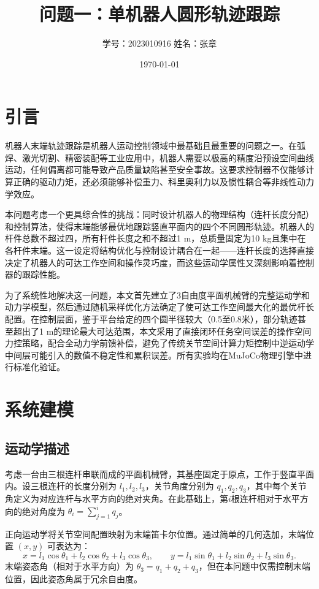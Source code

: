 \documentclass{article}
\title{\textbf{问题一：单机器人圆形轨迹跟踪}}
\author{学号：2023010916 \quad 姓名：张章}
\date{\today}
\begin{document}
\maketitle

\section{引言}

机器人末端轨迹跟踪是机器人运动控制领域中最基础且最重要的问题之一。在弧焊、激光切割、精密装配等工业应用中，机器人需要以极高的精度沿预设空间曲线运动，任何偏离都可能导致产品质量缺陷甚至安全事故。这要求控制器不仅能够计算正确的驱动力矩，还必须能够补偿重力、科里奥利力以及惯性耦合等非线性动力学效应。

本问题考虑一个更具综合性的挑战：同时设计机器人的物理结构（连杆长度分配）和控制算法，使得末端能够最优地跟踪竖直平面内的四个不同圆形轨迹。机器人的杆件总数不超过四，所有杆件长度之和不超过1 m，总质量固定为10 kg且集中在各杆件末端。这一设定将结构优化与控制设计耦合在一起——连杆长度的选择直接决定了机器人的可达工作空间和操作灵巧度，而这些运动学属性又深刻影响着控制器的跟踪性能。

为了系统性地解决这一问题，本文首先建立了3自由度平面机械臂的完整运动学和动力学模型，然后通过随机采样优化方法确定了使可达工作空间最大化的最优杆长配置。在控制层面，鉴于平台给定的四个圆半径较大（0.5至0.8米），部分轨迹甚至超出了1 m的理论最大可达范围，本文采用了直接闭环任务空间误差的操作空间力控策略，配合全动力学前馈补偿，避免了传统关节空间计算力矩控制中逆运动学中间层可能引入的数值不稳定性和累积误差。所有实验均在MuJoCo物理引擎中进行标准化验证。

\section{系统建模}

\subsection{运动学描述}

考虑一台由三根连杆串联而成的平面机械臂，其基座固定于原点，工作于竖直平面内。设三根连杆的长度分别为 \(l_1, l_2, l_3\)，关节角度分别为 \(q_1, q_2, q_3\)，其中每个关节角定义为对应连杆与水平方向的绝对夹角。在此基础上，第\(i\)根连杆相对于水平方向的绝对角度为 \(\theta_i = \sum_{j=1}^{i} q_j\)。

正向运动学将关节空间配置映射为末端笛卡尔位置。通过简单的几何迭加，末端位置 \((x, y)\) 可表达为：
\begin{equation}
x = l_1\cos\theta_1 + l_2\cos\theta_2 + l_3\cos\theta_3,\qquad
y = l_1\sin\theta_1 + l_2\sin\theta_2 + l_3\sin\theta_3.
\end{equation}
末端姿态角（相对于水平方向）为 \(\theta_3 = q_1+q_2+q_3\)，但在本问题中仅需控制末端位置，因此姿态角属于冗余自由度。
\end{document}
